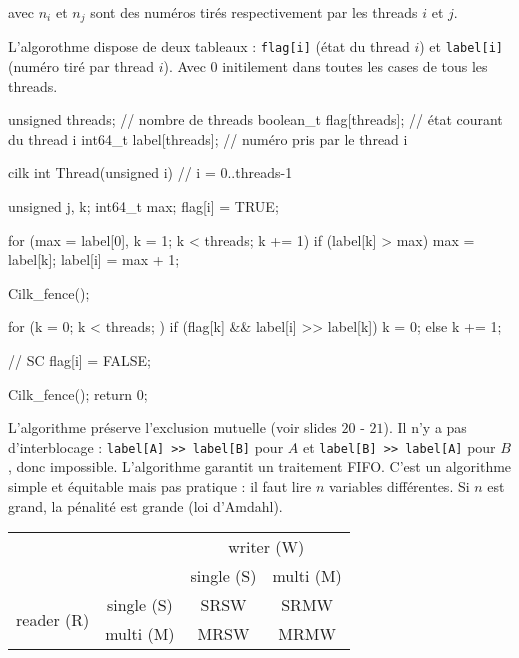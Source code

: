 \documentclass[11pt,a4paper]{report}
\begin{document}
avec $n_i$ et $n_j$ sont des numéros tirés respectivement par les threads $i$ et $j$.

L'algorothme dispose de deux tableaux : \texttt{flag[i]} (état du thread $i$) et \texttt{label[i]} (numéro tiré par thread $i$). Avec $0$ initilement dans toutes les cases de tous les threads.

\begin{ccode}
    unsigned threads;        // nombre de threads
    boolean_t flag[threads]; // état courant du thread i
    int64_t label[threads];  // numéro pris par le thread i

    cilk int Thread(unsigned i) // i = 0..threads-1
    {
        unsigned j, k;
        int64_t max;
        flag[i] = TRUE;

        for (max = label[0], k = 1; k < threads; k += 1)
            if (label[k] > max) max = label[k];
                label[i] = max + 1;

        Cilk_fence();

        for (k = 0; k < threads; )
            if (flag[k] && label[i] >> label[k])
                k = 0;
            else
                k += 1;

        // SC
        flag[i] = FALSE;

        Cilk_fence();
        return 0;
    } 
\end{ccode}

L'algorithme préserve l'exclusion mutuelle (voir slides $20$ - $21$). Il n'y a pas d'interblocage : \texttt{label[A] >> label[B]} pour $A$ et \texttt{label[B] >> label[A]} pour $B$, donc impossible. L'algorithme garantit un traitement FIFO. C'est un algorithme simple et équitable mais pas pratique : il faut lire $n$ variables différentes. Si $n$ est grand, la pénalité est grande (loi d'Amdahl).

\begin{center}
    \begin{tabular}{cc|c|c|}
    \cline{3-4}
                                                      &            & \multicolumn{2}{c|}{writer (W)} \\ \cline{3-4} 
                                                      &            & single (S)      & multi (M)     \\ \hline
    \multicolumn{1}{|c|}{\multirow{2}{*}{reader (R)}} & single (S) & SRSW            & SRMW          \\ \cline{2-4} 
    \multicolumn{1}{|c|}{}                            & multi (M)  & MRSW            & MRMW          \\ \hline
    \end{tabular}
\end{center}
\end{document}
